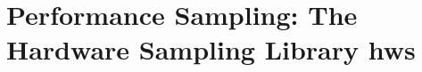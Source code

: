 \section{Performance Sampling: The Hardware Sampling Library hws}

\cite{own_hws_hpo}
\cite{own_hws_poster}




